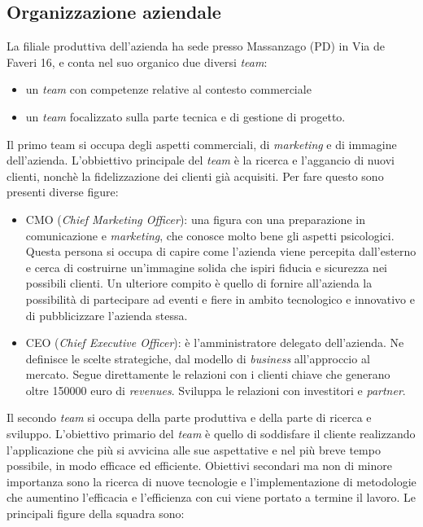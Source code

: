 \subsection{Organizzazione aziendale}
La filiale produttiva dell’azienda ha sede presso Massanzago (PD) in Via de Faveri 16, e conta nel suo organico due diversi \textit{team}: 
\begin{itemize}
\item un \textit{team} con competenze relative al contesto commerciale
\item un \textit{team} focalizzato sulla parte tecnica e di gestione di progetto.
\end{itemize}
\noindent
Il primo team si occupa degli aspetti commerciali, di \textit{marketing} e di immagine dell'azienda. L'obbiettivo principale del \textit{team} \`e la ricerca e l'aggancio di nuovi clienti, nonch\`e la fidelizzazione dei clienti gi\`a acquisiti. Per fare questo sono presenti diverse figure:
\begin{itemize}
	\item CMO (\textit{Chief Marketing Officer}): una figura con una preparazione in comunicazione e \textit{marketing}, che conosce molto bene gli aspetti psicologici. Questa persona si occupa di capire come l'azienda viene percepita dall'esterno e cerca di costruirne un'immagine solida che ispiri fiducia e sicurezza nei possibili clienti. Un ulteriore compito \`e quello di fornire all'azienda la possibilit\`a di partecipare ad eventi e fiere in ambito tecnologico e innovativo e di pubblicizzare l'azienda stessa.
	\item CEO (\textit{Chief Executive Officer}): \`e l'amministratore delegato dell'azienda. Ne definisce le scelte strategiche, dal modello di \textit{business\gloss} all'approccio al mercato. Segue direttamente le relazioni con i clienti chiave che generano oltre 150000 euro di \textit{revenues\gloss}. Sviluppa le relazioni con investitori e \textit{partner}.
\end{itemize}
\noindent
Il secondo \textit{team} si occupa della parte produttiva e della parte di ricerca e sviluppo. L'obiettivo primario del \textit{team} \`e quello di soddisfare il cliente realizzando l'applicazione che pi\`u si avvicina alle sue aspettative e nel pi\`u breve tempo possibile, in modo efficace ed efficiente. Obiettivi secondari ma non di minore importanza sono la ricerca di nuove tecnologie e l'implementazione di metodologie che aumentino l'efficacia e l'efficienza con cui viene portato a termine il lavoro.
Le principali figure della squadra sono:
